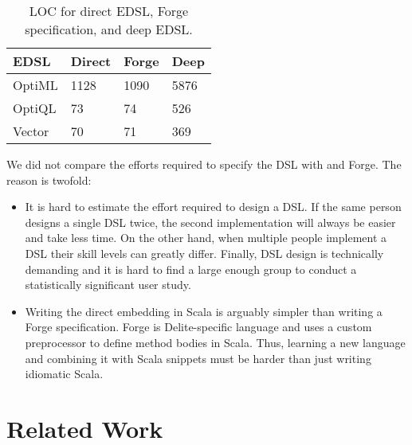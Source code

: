 \begin{table}[ht]
\caption{LOC for direct EDSL, Forge specification, and deep EDSL.}
\label{tbl:deepgen}
\centering
\begin{tabularx}{\linewidth}{ X X X X }
\toprule
 EDSL       &   Direct      &     Forge     &   Deep      \\ \midrule
OptiML      &   1128        &     1090    &   5876      \\
OptiQL      &   73          &     74      &   526       \\
Vector      &   70          &     71      &   369       \\
\bottomrule
\end{tabularx}
\end{table}

We did not compare the efforts required to specify the DSL with \yy and Forge. The
reason is twofold:
\begin{itemize}

\item It is hard to estimate the effort required to design a DSL. If the same
person designs a single DSL twice, the second implementation will always be
easier and take less time. On the other hand, when multiple people implement a DSL their skill levels
can greatly differ. Finally, DSL design is technically demanding and it is hard to find
a large enough group to conduct a statistically significant user
study.

\item Writing the direct embedding in Scala is arguably simpler than writing a
Forge specification. Forge is Delite-specific language and uses a custom
preprocessor to define method bodies in Scala. Thus, learning a new language and
combining it with Scala snippets must be harder than just writing idiomatic
Scala.
\end{itemize}


\section{Related Work}
\label{sec:related-work-generation}





















